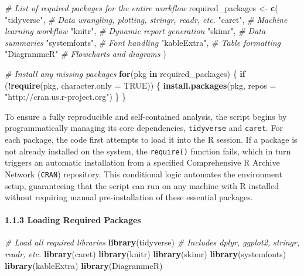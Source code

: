 \documentclass[
]{article}
\newenvironment{Shaded}{\begin{snugshade}}{\end{snugshade}}
\newcommand{\AttributeTok}[1]{\textcolor[rgb]{0.13,0.29,0.53}{#1}}
\newcommand{\CommentTok}[1]{\textcolor[rgb]{0.56,0.35,0.01}{\textit{#1}}}
\newcommand{\ConstantTok}[1]{\textcolor[rgb]{0.56,0.35,0.01}{#1}}
\newcommand{\ControlFlowTok}[1]{\textcolor[rgb]{0.13,0.29,0.53}{\textbf{#1}}}
\newcommand{\FunctionTok}[1]{\textcolor[rgb]{0.13,0.29,0.53}{\textbf{#1}}}
\newcommand{\NormalTok}[1]{#1}
\newcommand{\OtherTok}[1]{\textcolor[rgb]{0.56,0.35,0.01}{#1}}
\newcommand{\SpecialCharTok}[1]{\textcolor[rgb]{0.81,0.36,0.00}{\textbf{#1}}}
\newcommand{\StringTok}[1]{\textcolor[rgb]{0.31,0.60,0.02}{#1}}
\begin{document}
\begin{Shaded}
\begin{Highlighting}[]
\CommentTok{\# List of required packages for the entire workflow}
\NormalTok{required\_packages }\OtherTok{\textless{}{-}} \FunctionTok{c}\NormalTok{(}
  \StringTok{"tidyverse"}\NormalTok{,    }\CommentTok{\# Data wrangling, plotting, stringr, readr, etc.}
  \StringTok{"caret"}\NormalTok{,        }\CommentTok{\# Machine learning workflow}
  \StringTok{"knitr"}\NormalTok{,        }\CommentTok{\# Dynamic report generation}
  \StringTok{"skimr"}\NormalTok{,        }\CommentTok{\# Data summaries}
  \StringTok{"systemfonts"}\NormalTok{,  }\CommentTok{\# Font handling}
  \StringTok{"kableExtra"}\NormalTok{,   }\CommentTok{\# Table formatting}
  \StringTok{"DiagrammeR"}    \CommentTok{\# Flowcharts and diagrams}
\NormalTok{)}

\CommentTok{\# Install any missing packages}
\ControlFlowTok{for}\NormalTok{(pkg }\ControlFlowTok{in}\NormalTok{ required\_packages) \{}
  \ControlFlowTok{if}\NormalTok{ (}\SpecialCharTok{!}\FunctionTok{require}\NormalTok{(pkg, }\AttributeTok{character.only =} \ConstantTok{TRUE}\NormalTok{)) \{}
    \FunctionTok{install.packages}\NormalTok{(pkg, }\AttributeTok{repos =} \StringTok{"http://cran.us.r{-}project.org"}\NormalTok{)}
\NormalTok{  \}}
\NormalTok{\}}
\end{Highlighting}
\end{Shaded}

To ensure a fully reproducible and self-contained analysis, the script
begins by programmatically managing its core dependencies,
\texttt{tidyverse} and \texttt{caret}. For each package, the code first
attempts to load it into the R session. If a package is not already
installed on the system, the \texttt{require()} function fails, which in
turn triggers an automatic installation from a specified Comprehensive R
Archive Network (\texttt{CRAN}) repository. This conditional logic
automates the environment setup, guaranteeing that the script can run on
any machine with R installed without requiring manual pre-installation
of these essential packages.

\paragraph{1.1.3 Loading Required
Packages}\label{loading-required-packages}

\begin{Shaded}
\begin{Highlighting}[]
\CommentTok{\# Load all required libraries}
\FunctionTok{library}\NormalTok{(tidyverse)    }\CommentTok{\# Includes dplyr, ggplot2, stringr, readr, etc.}
\FunctionTok{library}\NormalTok{(caret)}
\FunctionTok{library}\NormalTok{(knitr)}
\FunctionTok{library}\NormalTok{(skimr)}
\FunctionTok{library}\NormalTok{(systemfonts)}
\FunctionTok{library}\NormalTok{(kableExtra)}
\FunctionTok{library}\NormalTok{(DiagrammeR)}
\end{Highlighting}
\end{Shaded}
\end{document}
